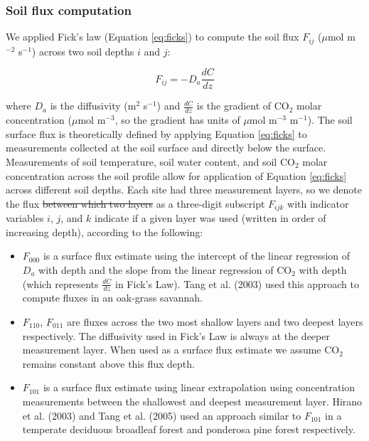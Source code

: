 \documentclass[
  letterpaper,
  DIV=11,
  numbers=noendperiod]{scrartcl}
\makeatletter
\providecommand{\tightlist}{%
  \setlength{\itemsep}{0pt}\setlength{\parskip}{0pt}} %
\providecommand{\DIFdel}[1]{{\protect\color{red}\sout{#1}}} %
\providecommand{\DIFdelbegin}{} %
\providecommand{\DIFdelend}{} %
\newcommand{\DIFscaledelfig}{0.5}
\newlength{\DIFdelgraphicswidth} %
\newlength{\DIFdelgraphicsheight} %
\newcommand{\DIFdelincludegraphics}[2][]{%
\sbox{\DIFdelgraphicsbox}{\DIFOincludegraphics[#1]{#2}}%
\settoboxwidth{\DIFdelgraphicswidth}{\DIFdelgraphicsbox} %
\settoboxtotalheight{\DIFdelgraphicsheight}{\DIFdelgraphicsbox} %
\scalebox{\DIFscaledelfig}{%
\parbox[b]{\DIFdelgraphicswidth}{\usebox{\DIFdelgraphicsbox}\\[-\baselineskip] \rule{\DIFdelgraphicswidth}{0em}}\llap{\resizebox{\DIFdelgraphicswidth}{\DIFdelgraphicsheight}{%
\setlength{\unitlength}{\DIFdelgraphicswidth}%
\begin{picture}(1,1)%
\thicklines\linethickness{2pt} %
{\color[rgb]{1,0,0}\put(0,0){\framebox(1,1){}}}%
{\color[rgb]{1,0,0}\put(0,0){\line( 1,1){1}}}%
{\color[rgb]{1,0,0}\put(0,1){\line(1,-1){1}}}%
\end{picture}%
}\hspace*{3pt}}} %
} %
\DeclareRobustCommand{\DIFdelbegin}{\DIFOdelbegin \let\includegraphics\DIFdelincludegraphics} %
\DeclareRobustCommand{\DIFdelend}{\DIFOaddend \let\includegraphics\DIFOincludegraphics} %
\let\sout@orig\sout %
\renewcommand{\sout}[1]{\ifmmode\text{\sout@orig{\ensuremath{#1}}}\else\sout@orig{#1}\fi} %
\makeatother
\begin{document}
\subsubsection{Soil flux computation}\label{sec-compute-soil-flux}

We applied Fick's law (Equation \ref{eq:ficks}) to compute the soil flux
\(F_{ij}\) (\(\mu\)mol m\(^{-2}\) s\(^{-1}\)) across two soil depths
\(i\) and \(j\):

\begin{equation}
  F_{ij} = -D_{a} \frac{dC}{dz}
  \label{eq:ficks}
\end{equation}

where \(D_{a}\) is the diffusivity (m\(^{2}\) s\(^{-1}\)) and
\(\frac{dC}{dz}\) is the gradient of CO\(_{2}\) molar concentration
(\(\mu\)mol m\(^{-3}\), so the gradient has units of \(\mu\)mol
m\(^{-3}\) m\(^{-1}\)). The soil surface flux is theoretically defined
by applying Equation \ref{eq:ficks} to measurements collected at the
soil surface and directly below the surface. Measurements of soil
temperature, soil water content, and soil CO\(_{2}\) molar concentration
across the soil profile allow for application of Equation \ref{eq:ficks}
across different soil depths. Each site had three measurement layers, so
we denote the flux \DIFdelbegin \DIFdel{between which two layers }\DIFdelend as a three-digit subscript \(F_{ijk}\) with indicator
variables \(i\), \(j\), and \(k\) indicate if a given layer was used
(written in order of increasing depth), according to the following:

\begin{itemize}
\tightlist
\item
  \(F_{000}\) is a surface flux estimate using the intercept of the
  linear regression of \(D_{a}\) with depth and the slope from the
  linear regression of CO\(_{2}\) with depth (which represents
  \(\displaystyle \frac{dC}{dz}\) in Fick's Law). Tang et al. (2003)
  used this approach to compute fluxes in an oak-grass savannah.
\item
  \(F_{110}\), \(F_{011}\) are fluxes across the two most shallow layers
  and two deepest layers respectively. The diffusivity used in Fick's
  Law is always at the deeper measurement layer. When used as a surface
  flux estimate we assume CO\(_{2}\) remains constant above this flux
  depth.
\item
  \(F_{101}\) is a surface flux estimate using linear extrapolation
  using concentration measurements between the shallowest and deepest
  measurement layer. Hirano et al. (2003) and Tang et al. (2005) used an
  approach similar to \(F_{101}\) in a temperate deciduous broadleaf
  forest and ponderosa pine forest respectively.
\end{itemize}
\end{document}
